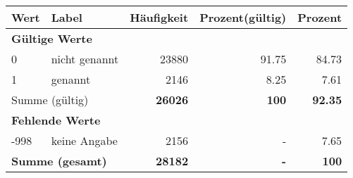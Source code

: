      \begin{longtable}{lXrrr}
     \toprule
     \textbf{Wert} & \textbf{Label} & \textbf{Häufigkeit} & \textbf{Prozent(gültig)} & \textbf{Prozent} \\
     \endhead
     \midrule
     \multicolumn{5}{l}{\textbf{Gültige Werte}}\\

     0 &
     \multicolumn{1}{X}{ nicht genannt   } &


       \num{23880} &
       \num[round-mode=places,round-precision=2]{91,75} &
         \num[round-mode=places,round-precision=2]{84,73} \\

     1 &
     \multicolumn{1}{X}{ genannt   } &


       \num{2146} &
       \num[round-mode=places,round-precision=2]{8,25} &
         \num[round-mode=places,round-precision=2]{7,61} \\
     \midrule
     \multicolumn{2}{l}{Summe (gültig)} &
       \textbf{\num{26026}} &
     \textbf{100} &
       \textbf{\num[round-mode=places,round-precision=2]{92,35}} \\
     \multicolumn{5}{l}{\textbf{Fehlende Werte}}\\
       -998 &
       keine Angabe &
         \num{2156} &
        - &
         \num[round-mode=places,round-precision=2]{7,65} \\
     \midrule
     \multicolumn{2}{l}{\textbf{Summe (gesamt)}} &
          \textbf{\num{28182}} &
        \textbf{-} &
        \textbf{100} \\
     \bottomrule
     \end{longtable}
     
